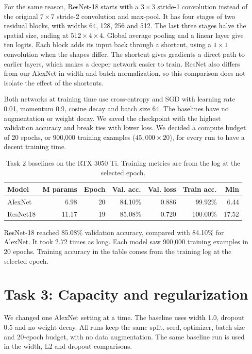 \documentclass[11pt,a4paper]{article}
\begin{document}
For the same reason, ResNet-18 starts with a $3\times3$ stride-1 convolution instead of the original $7\times7$ stride-2 convolution and max-pool. It has four stages of two residual blocks, with widths 64, 128, 256 and 512. The last three stages halve the spatial size, ending at $512\times4\times4$. Global average pooling and a linear layer give ten logits. Each block adds its input back through a shortcut, using a $1\times1$ convolution when the shapes differ. The shortcut gives gradients a direct path to earlier layers, which makes a deeper network easier to train. ResNet also differs from our AlexNet in width and batch normalization, so this comparison does not isolate the effect of the shortcuts.

Both networks at training time use cross-entropy and SGD with learning rate 0.01, momentum 0.9, cosine decay and batch size 64. 
The baselines have no augmentation or weight decay.
We saved the checkpoint with the highest validation accuracy and break ties with lower loss. 
We decided a compute budget of 20 epochs, or 900,000 training examples ($45{,}000\times20$), for every run to have a decent training time.

\begin{table}[htbp]\centering\small
\caption{Task 2 baselines on the RTX 3050 Ti. Training metrics are from the log at the selected epoch.}
\begin{tabular}{lrrrrrr}
\toprule
Model & M params & Epoch & Val. acc. & Val. loss & Train acc. & Min\\
\midrule
AlexNet & 6.98 & 20 & 84.10\% & 0.886 & 99.92\% & 6.44\\
ResNet18 & 11.17 & 19 & 85.08\% & 0.720 & 100.00\% & 17.52\\
\bottomrule\end{tabular}\end{table}
ResNet-18 reached 85.08\% validation accuracy, compared with 84.10\% for AlexNet. It took 2.72 times as long. Each model saw 900,000 training examples in 20 epochs. Training accuracy in the table comes from the training log at the selected epoch.

\section{Task 3: Capacity and regularization}
We changed one AlexNet setting at a time. 
The baseline uses width 1.0, dropout 0.5 and no weight decay. 
All runs keep the same split, seed, optimizer, batch size and 20-epoch budget, with no data augmentation. 
The same baseline run is used in the width, L2 and dropout comparisons.
\end{document}
